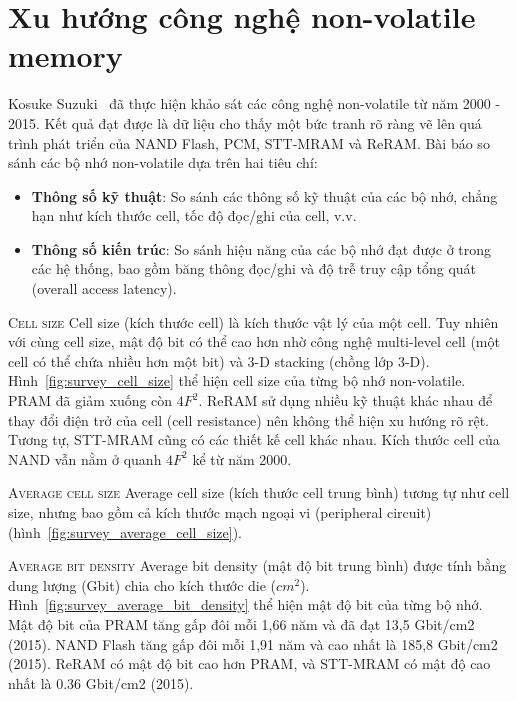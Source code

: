 \section{Xu hướng công nghệ non-volatile memory}
\label{chap:experiments}

Kosuke Suzuki~\cite{suzukiSurveyTrendsNonVolatile2015a} đã thực hiện khảo sát
các công nghệ non-volatile từ năm 2000 - 2015. Kết quả đạt được là dữ liệu cho
thấy một bức tranh rõ ràng vẽ lên quá trình phát triển của NAND Flash, PCM,
STT-MRAM và ReRAM. Bài báo so sánh các bộ nhớ non-volatile dựa trên hai tiêu
chí:

\begin{itemize}
    \item \textbf{Thông số kỹ thuật}: So sánh các thông số kỹ thuật của các bộ
    nhớ, chẳng hạn như kích thước cell, tốc độ đọc/ghi của cell, v.v.

    \item \textbf{Thông số kiến trúc}: So sánh hiệu năng của các bộ nhớ đạt
    được ở trong các hệ thống, bao gồm băng thông đọc/ghi và độ trễ truy cập
    tổng quát (overall access latency).
\end{itemize}

\textsc{Cell size} \hspace{0.5cm} Cell size (kích thước cell) là kích thước vật
lý của một cell. Tuy nhiên với cùng cell size, mật độ bit có thể cao hơn nhờ
công nghệ multi-level cell (một cell có thể chứa nhiều hơn một bit) và 3-D
stacking (chồng lớp 3-D). Hình~\ref{fig:survey_cell_size} thể hiện cell size
của từng bộ nhớ non-volatile. PRAM đã giảm xuống còn $4F^2$. ReRAM sử dụng
nhiều kỹ thuật khác nhau để thay đổi điện trở của cell (cell resistance) nên
không thể hiện xu hướng rõ rệt. Tương tự, STT-MRAM cũng có các thiết kế cell
khác nhau. Kích thước cell của NAND vẫn nằm ở quanh $4F^2$ kể từ năm 2000.


\textsc{Average cell size} \hspace{0.5cm} Average cell size (kích thước cell
trung bình) tương tự như cell size, nhưng bao gồm cả kích thước mạch ngoại vi
(peripheral circuit) (hình~\ref{fig:survey_average_cell_size}).


\textsc{Average bit density} \hspace{0.5cm} Average bit density (mật độ bit
trung bình) được tính bằng dung lượng (Gbit) chia cho kích thước die ($cm^2$).
Hình~\ref{fig:survey_average_bit_density} thể hiện mật độ bit của từng bộ nhớ.
Mật độ bit của PRAM tăng gấp đôi mỗi 1,66 năm và đã đạt 13,5 Gbit/cm2 (2015).
NAND Flash tăng gấp đôi mỗi 1,91 năm và cao nhất là 185,8 Gbit/cm2 (2015).
ReRAM có mật độ bit cao hơn PRAM, và STT-MRAM có mật độ cao nhất là 0.36
Gbit/cm2 (2015).

